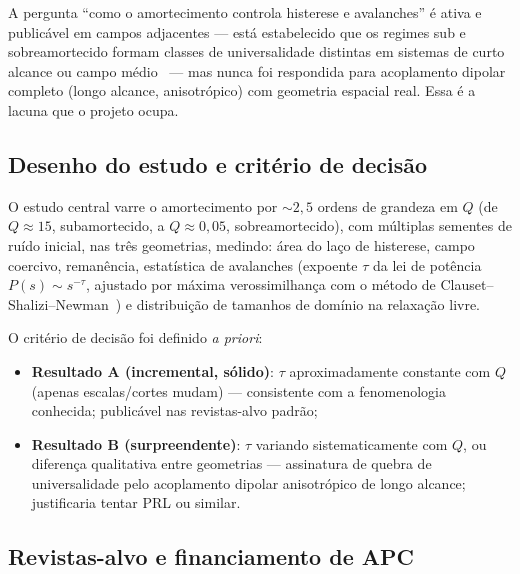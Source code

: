 \documentclass[11pt,a4paper]{article}
\begin{document}
A pergunta ``como o amortecimento controla histerese e avalanches'' é
ativa e publicável em campos adjacentes --- está estabelecido que os
regimes sub e sobreamortecido formam classes de universalidade
distintas em sistemas de curto alcance ou campo médio~\cite{dahmen2011}
--- mas nunca foi respondida para acoplamento dipolar completo
(longo alcance, anisotrópico) com geometria espacial real. Essa é a
lacuna que o projeto ocupa.

\subsection{Desenho do estudo e critério de decisão}

O estudo central varre o amortecimento por $\sim 2{,}5$ ordens de
grandeza em $Q$ (de $Q \approx 15$, subamortecido, a $Q \approx 0{,}05$,
sobreamortecido), com múltiplas sementes de ruído inicial, nas três
geometrias, medindo: área do laço de histerese, campo coercivo,
remanência, estatística de avalanches (expoente $\tau$ da lei de
potência $P(s) \sim s^{-\tau}$, ajustado por máxima verossimilhança com
o método de Clauset--Shalizi--Newman~\cite{clauset2009}) e distribuição
de tamanhos de domínio na relaxação livre.

O critério de decisão foi definido \emph{a priori}:
\begin{itemize}
\item \textbf{Resultado A (incremental, sólido)}: $\tau$ aproximadamente
constante com $Q$ (apenas escalas/cortes mudam) --- consistente com a
fenomenologia conhecida; publicável nas revistas-alvo padrão;
\item \textbf{Resultado B (surpreendente)}: $\tau$ variando
sistematicamente com $Q$, ou diferença qualitativa entre geometrias ---
assinatura de quebra de universalidade pelo acoplamento dipolar
anisotrópico de longo alcance; justificaria tentar PRL ou similar.
\end{itemize}

\subsection{Revistas-alvo e financiamento de APC}
\end{document}
